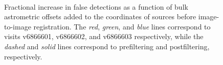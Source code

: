 \documentclass[prd, nofootinbib, floatfix, 11pt,tightenlines,times]{article}
\begin{document}
\begin{figure}
 \\
\caption{Fractional increase in false detections as a function of bulk
  astrometric offsets added to the coordinates of sources before
  image-to-image registration.  The {\it red}, {\it green}, and {\it
    blue} lines correspond to visits v6866601, v6866602, and v6866603
  respectively, while the {\it dashed} and {\it solid} lines
  correspond to prefiltering and postfiltering, respectively.}
\label{wcsshift}
\end{figure}
\end{document}
